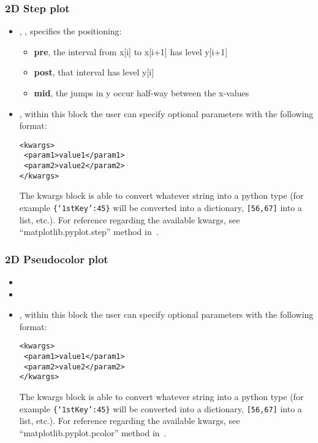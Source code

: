 \subsubsection{2D Step plot}
  \begin{itemize}
    \item {}, , specifies the 
    positioning:
    \begin{itemize}
      \item \textbf{pre}, the interval from x[i] to x[i+1] has level y[i+1]
      \item \textbf{post}, that interval has level y[i]
      \item \textbf{mid}, the jumps in y occur half-way between the x-values
    \end{itemize}
  \item {}, within this block the user can specify optional
  parameters with the following format:

\begin{lstlisting}[style=XML]
<kwargs>
 <param1>value1</param1>
 <param2>value2</param2>
</kwargs>
\end{lstlisting}

  The kwargs block is able to convert whatever string into a python type (for
  example  \texttt{\{`1stKey':45\}} will
  be converted into a dictionary, 
   \texttt{[56,67]}  into a list, etc.).
    For reference regarding the available kwargs, see ``matplotlib.pyplot.step''
    method in~\cite{MatPlotLib}.
  \end{itemize}

\subsubsection{2D Pseudocolor plot}
  \begin{itemize}
    \item \interpolationDescription[linear]
    \item {}
    \item {}, within this block the user can specify optional
    parameters with the following format:

\begin{lstlisting}[style=XML]
<kwargs>
 <param1>value1</param1>
 <param2>value2</param2>
</kwargs>
\end{lstlisting}

  The kwargs block is able to convert whatever string into a python type (for
  example  \texttt{\{`1stKey':45\}} will
  be converted into a dictionary, 
   \texttt{[56,67]}  into a list, etc.).
    For reference regarding the available kwargs, see 
    ``matplotlib.pyplot.pcolor'' method in~\cite{MatPlotLib}.
  \end{itemize}

